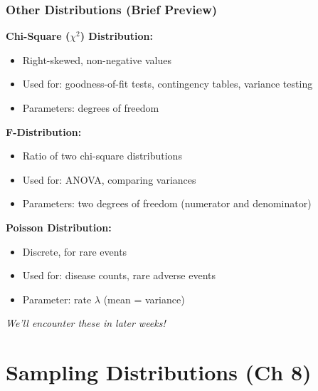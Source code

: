\documentclass{beamer}
\begin{document}
\begin{frame}
\frametitle{Other Distributions (Brief Preview)}
\textbf{Chi-Square ($\chi^2$) Distribution:}
\begin{itemize}
\item Right-skewed, non-negative values
\item Used for: goodness-of-fit tests, contingency tables, variance testing
\item Parameters: degrees of freedom
\end{itemize}

\vspace{0.5cm}
\textbf{F-Distribution:}
\begin{itemize}
\item Ratio of two chi-square distributions
\item Used for: ANOVA, comparing variances
\item Parameters: two degrees of freedom (numerator and denominator)
\end{itemize}

\vspace{0.5cm}
\textbf{Poisson Distribution:}
\begin{itemize}
\item Discrete, for rare events
\item Used for: disease counts, rare adverse events
\item Parameter: rate $\lambda$ (mean = variance)
\end{itemize}

\vspace{0.3cm}
\textit{We'll encounter these in later weeks!}
\end{frame}

\section{Sampling Distributions (Ch 8)}
\end{document}
